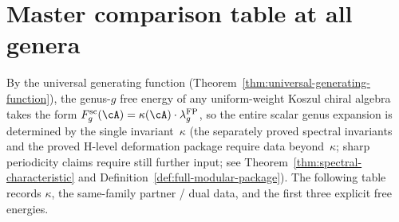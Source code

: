 
\section{Master comparison table at all genera}
\label{sec:master-genus-comparison}

By the universal generating function
(Theorem~\ref{thm:universal-generating-function}), the genus-$g$
free energy of any uniform-weight Koszul chiral algebra takes the form
$F_g^{\mathrm{sc}}(\cA)
= \kappa(\cA) \cdot \lambda_g^{\mathrm{FP}}$, so the
entire scalar genus expansion is determined by the single
invariant~$\kappa$ (the separately proved spectral invariants and the
proved H-level deformation package require data beyond~$\kappa$; sharp
periodicity claims require still further input; see
Theorem~\ref{thm:spectral-characteristic} and
Definition~\ref{def:full-modular-package}).
The following table records $\kappa$, the same-family partner / dual data, and
the first three explicit free energies.

